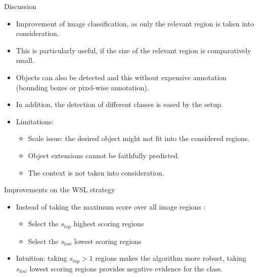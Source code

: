 \documentclass[xcolor=pdftex,dvipsnames,table]{beamer}
\begin{document}
\begin{frame}{Discussion}
\begin{itemize}
   \item Improvement of image classification, as only the relevant region is taken into consideration.
   \item This is particularly useful, if the size of the relevant region is comparatively small. 
   \item Objects can also be detected and this without expensive annotation (bounding boxes or pixel-wise annotation). 
   \item In addition, the detection of different classes is eased by the setup. 
   \item Limitations:
   \begin{itemize}
      \item Scale issue: the desired object might not fit into the considered regions.
      \item Object extensions cannot be faithfully predicted. 
      \item The context is not taken into consideration. 
   \end{itemize}
\end{itemize}
\end{frame}

\begin{frame}{Improvements on the WSL strategy}
\begin{itemize}
   \item Instead of taking the maximum score over all image regions \cite{Durand2016}:
   \begin{itemize}
      \item Select the $s_{top}$ highest scoring regions
      \item Select the $s_{low}$ lowest scoring regions
   \end{itemize}
   \item Intuition: taking $s_{top}>1$ regions makes the algorithm more robust, taking $s_{low}$ lowest scoring regions provides negative evidence for the class. 
\end{itemize}
\end{frame}
\end{document}
